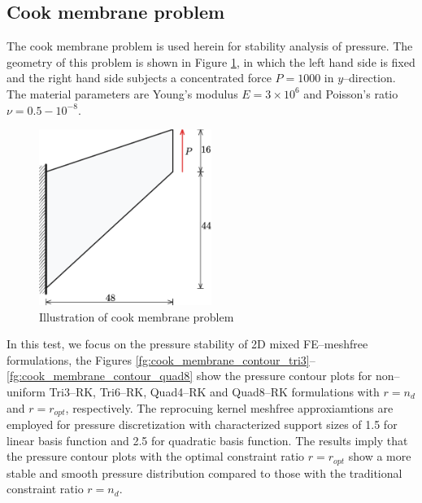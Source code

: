 \subsection{Cook membrane problem}

The cook membrane problem \cite{simo1990} is used herein for stability analysis of pressure. The geometry of this problem is shown in Figure \ref{fg:cook_illsutration},
in which the left hand side is fixed and the right hand side subjects a concentrated force $P=1000$ in $y$--direction.
The material parameters are Young's modulus $E=3\times 10^6$ and Poisson's ratio $\nu=0.5-10^{-8}$.

\begin{figure}[H]
\centering
\includegraphics[width=0.5\textwidth]{png/cook_membrane_model.png}
\caption{Illustration of cook membrane problem}\label{fg:cook_illsutration}
\end{figure}

In this test, we focus on the pressure stability of 2D mixed FE--meshfree formulations,
the Figures \ref{fg:cook_membrane_contour_tri3}--\ref{fg:cook_membrane_contour_quad8} show the pressure contour plots for non--uniform Tri3--RK, Tri6--RK, Quad4--RK and Quad8--RK formulations with $r=n_d$ and $r=r_{opt}$, respectively.
The reprocuing kernel meshfree approxiamtions are employed for pressure discretization with characterized support sizes of 1.5 for linear basis function and 2.5 for quadratic basis function.
The results imply that the pressure contour plots with the optimal constraint ratio $r=r_{opt}$ show a more stable and smooth pressure distribution compared to those with the traditional constraint ratio $r=n_d$.

